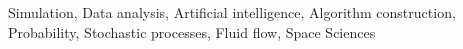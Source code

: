 \documentclass[]{article}
\begin{document}
Simulation, Data analysis, Artificial intelligence, Algorithm construction, Probability, Stochastic processes, Fluid flow, Space Sciences
\end{document}
